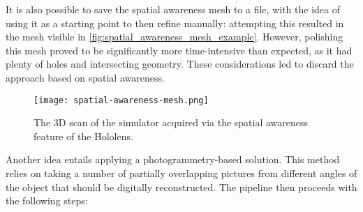 It is also possible to save the spatial awareness mesh to a file, with the idea of using it as a starting point to then refine manually: attempting this resulted in the mesh visible in \autoref{fig:spatial_awareness_mesh_example}. However, polishing this mesh proved to be significantly more time-intensive than expected, as it had plenty of holes and intersecting geometry. These considerations led to discard the approach based on spatial awareness.

\begin{figure}
  \centering
  \texttt{[image: spatial-awareness-mesh.png]}
  \caption{The 3D scan of the simulator acquired via the spatial awareness feature of the Hololens.}\label{fig:spatial_awareness_mesh_example}
\end{figure}

Another idea entails applying a photogrammetry-based solution. This method relies on taking a number of partially overlapping pictures from different angles of the object that should be digitally reconstructed. The pipeline then proceeds with the following steps:


